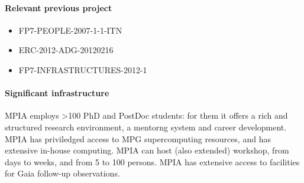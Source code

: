 \paragraph{Relevant previous project}
\begin{itemize}
    \item FP7-PEOPLE-2007-1-1-ITN
    \item ERC-2012-ADG-20120216
    \item FP7-INFRASTRUCTURES-2012-1
\end{itemize}

\paragraph{Significant infrastructure}
MPIA employs >100 PhD and PostDoc students: for them it offers 
a rich and structured research environment, a mentorng system
and career development. MPIA has priviledged access to MPG supercomputing resources,
and has extensive in-house computing. MPIA can host (also extended) workshop, from days to weeks, and from 5 to 100 persons. MPIA has extensive access to facilities for Gaia follow-up observations.


